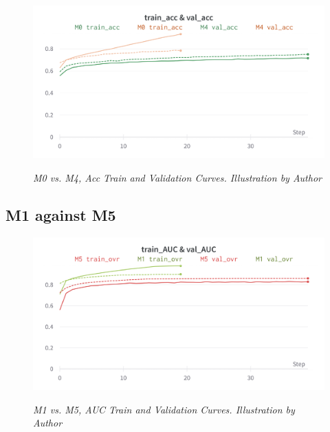 \begin{figure}[H]
\centering
    \includegraphics[width=\textwidth]{imatges/results/AccM0M4.png}
\caption[M0 vs. M4, Acc Train and Validation Curves]{\textit{M0 vs. M4, Acc Train and Validation Curves. Illustration by Author}}
{\label{fig:accm0m4}}
\end{figure}

\newpage


\subsection{M1 against M5}

\begin{figure}[H]
\centering
    \includegraphics[width=\textwidth]{imatges/results/AUCM1M5.png}
\caption[M1 vs. M5, AUC Train and Validation Curves]{\textit{M1 vs. M5, AUC Train and Validation Curves. Illustration by Author}}
{\label{fig:aucm0m4}}
\end{figure}


